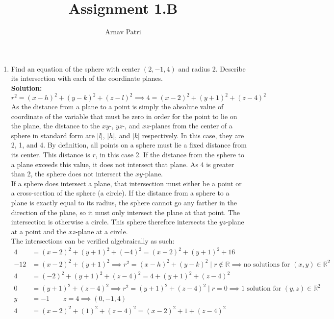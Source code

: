 \documentclass{article}[A4, 12pt]
\title{Assignment 1.B}
\author{Arnav Patri}
\begin{document}
	\maketitle
	\begin{enumerate}
		\item
			Find an equation of the sphere with center $(2, -1,4)$  and radius 2. Describe its intersection with each of the coordinate planes. \\
			\textbf{Solution:}
			\[r^2 = (x - h)^2 + (y - k)^2 + (z - l)^2 \implies 4 = (x - 2)^2 +(y + 1)^2 + (z - 4)^2 \]
			As the distance from a plane to a point is simply the absolute value of coordinate of the variable that must be zero in order for the point to lie on the plane, the distance to the $xy$-, $yz$-, and $xz$-planes from the center of a sphere in standard form are $|l|$, $|h|$, and $|k|$ respectively. In this case, they are 2, 1, and 4. By definition, all points on a sphere must lie a fixed distance from its center. This distance is $r$, in this case 2. If the distance from the sphere to a plane exceeds this value, it does not intersect that plane. As 4 is greater than 2, the sphere does not intersect the $xy$-plane. \\
			If a sphere does intersect a plane, that intersection must either be a point or a cross-section of the sphere (a circle). If the distance from a sphere to a plane is exactly equal to its radius, the sphere cannot go any farther in the direction of the plane, so it must only intersect the plane at that point. The intersection is otherwise a circle. This sphere therefore intersects the $yz$-plane at a point and the $xz$-plane at a circle. \\
			The intersections can be verified algebraically as such:
			\begin{align*}
				4 &= (x - 2)^2 + (y + 1)^2 + (-4)^2 
						= (x - 2)^2 + (y + 1)^2 + 16  \tag{$xy$} \\
					-12 &= (x - 2)^2 + (y + 1)^2 
						\implies r^2 = (x - h)^2 + (y - k)^2 \mid r \notin \mathbb{R} \implies \text{no solutions for } (x, y) \in \mathbb{R}^2 \\
				4 &= (-2)^2 + (y + 1)^2 + (z - 4)^2 
						= 4 + (y + 1)^2 + (z - 4)^2 \tag{$yz$} \\
					0 &= (y + 1)^2 + (z - 4)^2 
						\implies r^2 = (y + 1)^2 + (z - 4)^2 \mid r = 0 \implies \text{1 solution for } (y, z) \in \mathbb{R}^2 \\
					y &= -1 \qquad z = 4 \implies (0, -1, 4) \\
				4 &= (x - 2)^2 + (1)^2 + (z - 4)^2 = (x - 2)^2 + 1 + (z - 4)^2

\end{align*}
\end{enumerate}
\end{document}
